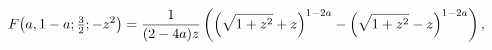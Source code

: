 \[\mathop{F\/}\nolimits\!\left(a,1-a;\tfrac{3}{2};-z^{2}\right)=\frac{1}{(2-4a)z%
}\left(\left(\sqrt{1+z^{2}}+z\right)^{1-2a}-\left(\sqrt{1+z^{2}}-z\right)^{1-2%
a}\right),\]
